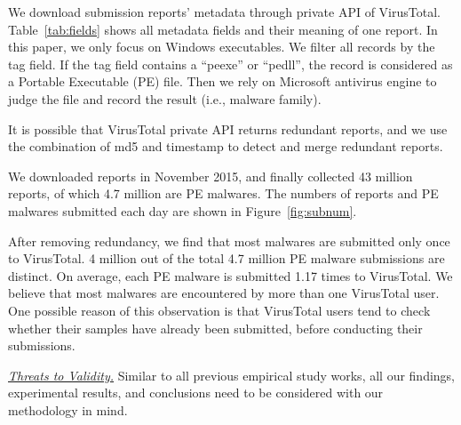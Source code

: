 We download submission reports' metadata through private API of VirusTotal. Table~\ref{tab:fields} shows all metadata fields and their meaning of one report. In this paper, we only focus on Windows executables. We filter all records by the tag field. If the tag field contains a ``peexe'' or ``pedll'', the record is considered as a Portable Executable (PE) file. Then we rely on Microsoft antivirus engine to judge the file and record the result (i.e., malware family). 

It is possible that VirusTotal private API returns redundant reports, 
and we use the combination of md5 and timestamp to detect and merge redundant reports.

We downloaded reports in November 2015, and finally collected 43 million reports, of which 4.7 million are PE malwares. 
The numbers of reports and PE malwares submitted each day are shown in Figure~\ref{fig:subnum}.



After removing redundancy, we find that most malwares are submitted only once to VirusTotal. 4 million out of the total 4.7 million PE malware submissions are distinct. On average, each PE malware is submitted 1.17 times to VirusTotal. We believe that most malwares are encountered by more than one VirusTotal user. One possible reason of this observation is that VirusTotal users 
tend to check whether their samples have already been submitted, 
before conducting their submissions.

\textit{\underline{Threats to Validity.}}
Similar to all previous empirical study works, all our findings, experimental results, 
and conclusions need to be considered with our methodology in mind. 

